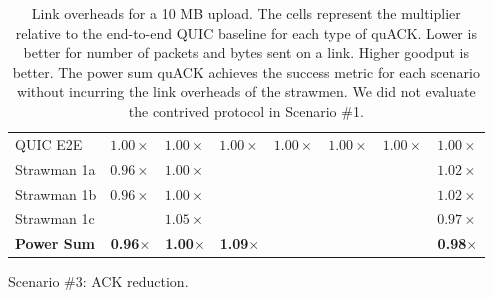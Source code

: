 \begin{table}[ht]
\begin{subtable}{\columnwidth}
\begin{tabular}{lccccccc}
    \midrule
    QUIC E2E & $1.00\times$ & $1.00\times$ & $1.00\times$ & $1.00\times$ & $1.00\times$ & $1.00\times$ & $1.00\times$ \\
    Strawman 1a & $0.96\times$ & $1.00\times$ & \cellcolor{LightRed}{$9.94\times$} & \cellcolor{LighterRed}{$4.99\times$} & \cellcolor{LightGreen}{$0.04\times$} & \cellcolor{LightGreen}{$0.08\times$} & $1.02\times$ \\
    Strawman 1b & $0.96\times$ & $1.00\times$ & \cellcolor{LightRed}{$9.95\times$} & \cellcolor{LightRed}{$7.13\times$}      & \cellcolor{LightGreen}{$0.04\times$} & \cellcolor{LightGreen}{$0.08\times$} & $1.02\times$ \\
    Strawman 1c & \cellcolor{LightestRed}{$1.91\times$} & $1.05\times$ & \cellcolor{LightRed}{$9.73\times$} & \cellcolor{LightRed}{$7.41\times$}      & \cellcolor{LightGreen}{$0.04\times$} & \cellcolor{LightGreen}{$0.08\times$} & $0.97\times$ \\
    \bf \textcolor{black!50!blue}{Power Sum}    & \textcolor{black!50!blue}{\bf 0.96$\times$} & \textcolor{black!50!blue}{\bf 1.00$\times$} & \textcolor{black!50!blue}{\bf 1.09$\times$} & \cellcolor{LighterRed}{\textcolor{black!50!blue}{\bf 2.56$\times$}} & \cellcolor{LightGreen}{\textcolor{black!50!blue}{\bf 0.04$\times$}} & \cellcolor{LightGreen}{\textcolor{black!50!blue}{\bf 0.08$\times$}} & \textcolor{black!50!blue}{\bf 0.98$\times$} \\
    \bottomrule
  \end{tabular}
  \caption{Scenario \#3: ACK reduction.}
  \label{tab:sidekick:packet-overheads:ackr}
\end{subtable}
\caption{Link overheads for a 10 MB upload. The cells represent the multiplier
relative to the end-to-end QUIC baseline for each type of quACK\@.
Lower is better for number of packets and bytes sent on a link.
Higher goodput is better. The power sum quACK achieves the success metric
for each scenario without incurring the link overheads of the strawmen.
We did not evaluate the contrived protocol in Scenario \#1.
}
\label{tab:sidekick:packet-overheads}
\end{table}
